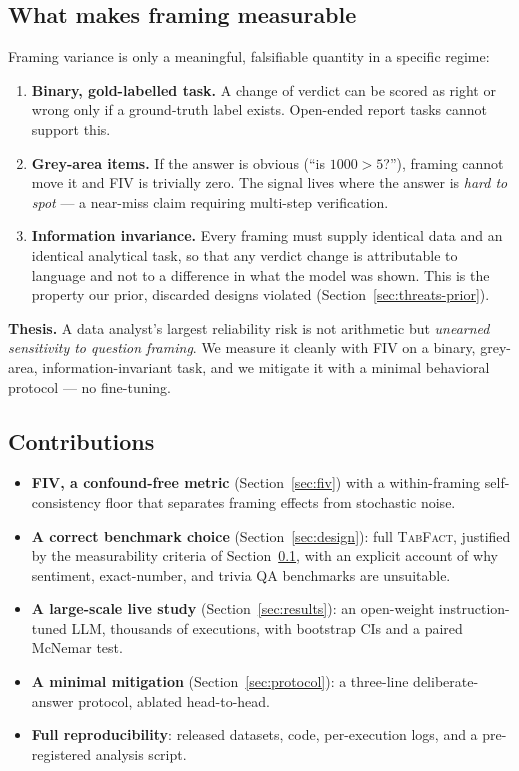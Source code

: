 \documentclass[10pt]{article}
\begin{document}
\subsection{What makes framing measurable}
\label{sec:measurable}
Framing variance is only a meaningful, falsifiable quantity in a specific regime:
\begin{enumerate}[leftmargin=1.4em,itemsep=2pt]
  \item \textbf{Binary, gold-labelled task.} A change of verdict can be scored as right or
  wrong only if a ground-truth label exists. Open-ended report tasks cannot support this.
  \item \textbf{Grey-area items.} If the answer is obvious (``is $1000>5$?''), framing
  cannot move it and FIV is trivially zero. The signal lives where the answer is
  \emph{hard to spot} --- a near-miss claim requiring multi-step verification.
  \item \textbf{Information invariance.} Every framing must supply identical data and an
  identical analytical task, so that any verdict change is attributable to language and
  not to a difference in what the model was shown. This is the property our prior,
  discarded designs violated (Section~\ref{sec:threats-prior}).
\end{enumerate}

\begin{keybox}
\textbf{Thesis.} A data analyst's largest reliability risk is not arithmetic but
\emph{unearned sensitivity to question framing}. We measure it cleanly with FIV on a
binary, grey-area, information-invariant task, and we mitigate it with a minimal
behavioral protocol --- no fine-tuning.
\end{keybox}

\subsection{Contributions}
\begin{itemize}[leftmargin=1.4em,itemsep=2pt]
  \item \textbf{FIV, a confound-free metric} (Section~\ref{sec:fiv}) with a within-framing
  self-consistency floor that separates framing effects from stochastic noise.
  \item \textbf{A correct benchmark choice} (Section~\ref{sec:design}): full \textsc{TabFact},
  justified by the measurability criteria of Section~\ref{sec:measurable}, with an explicit
  account of why sentiment, exact-number, and trivia QA benchmarks are unsuitable.
  \item \textbf{A large-scale live study} (Section~\ref{sec:results}): an open-weight
  instruction-tuned LLM, thousands of executions, with bootstrap CIs and a paired McNemar test.
  \item \textbf{A minimal mitigation} (Section~\ref{sec:protocol}): a three-line
  deliberate-answer protocol, ablated head-to-head.
  \item \textbf{Full reproducibility}: released datasets, code, per-execution logs, and a
  pre-registered analysis script.
\end{itemize}
\end{document}

